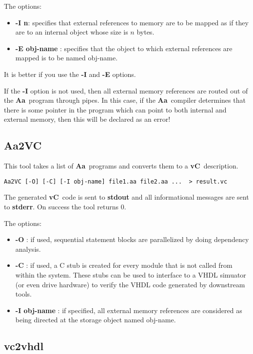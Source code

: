 \documentclass{article}
\newcommand{\Aa}{{\bf Aa}~}
\newcommand{\vC}{{\bf vC}~}
\begin{document}
The options:
\begin{itemize}
\item {\bf -I n}: specifies that external references to memory
are to be mapped as if they are to an internal object whose size
is $n$ bytes.
\item {\bf -E obj-name} : specifies that the object to which
external references are mapped is to be named obj-name.
\end{itemize}
It is better if you use the {\bf -I} and {\bf -E} options.  

If the {\bf -I} option is not used, then all external memory
references are routed out of the \Aa program through pipes.
In this case, if the \Aa compiler determines that there is some pointer 
in the program which can point
to both internal and external memory, then this will be
declared as an error!




\subsection{{\bf Aa2VC}}

This tool takes a list of \Aa programs and converts them
to a \vC description. 
\begin{verbatim}
Aa2VC [-O] [-C] [-I obj-name] file1.aa file2.aa ...  > result.vc
\end{verbatim}
The generated \vC code is sent to {\bf stdout} and all informational
messages are sent to {\bf stderr}.  On success the tool returns 0.

The options:
\begin{itemize}
\item {\bf -O} : if used, sequential statement blocks are parallelized
by doing dependency analysis.
\item {\bf -C} : if used, a C stub is created for every module that
is not called from within the system.  These stubs can be used to
interface to a VHDL simuator (or even drive hardware) to verify
the VHDL code generated by downstream tools.
\item {\bf -I obj-name} : if specified, all external memory references
are considered as being directed at the storage object named obj-name.
\end{itemize}

\subsection{\bf vc2vhdl}
\end{document}
